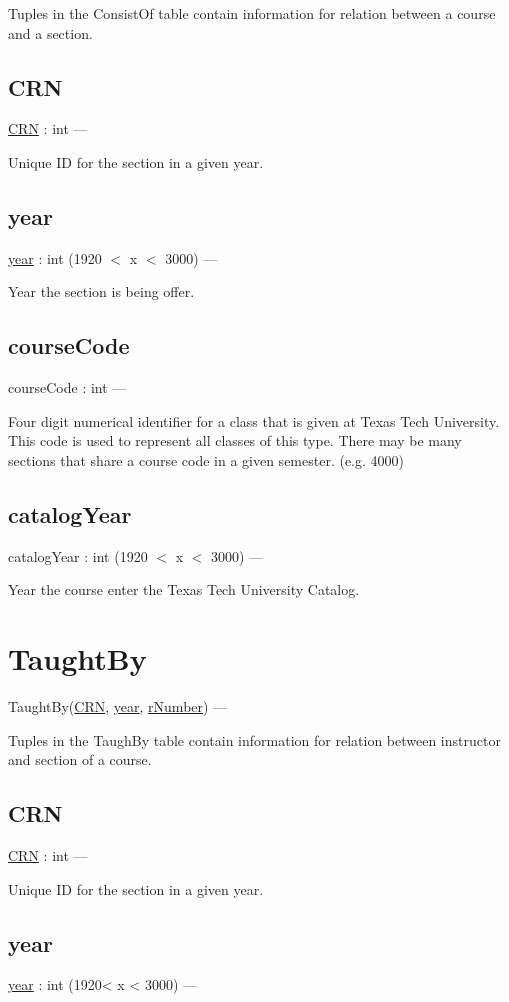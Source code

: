 \documentclass[10pt]{article}
\begin{document}
Tuples in the ConsistOf table contain information for relation between a course and a section.
	
	\subsection{CRN}
	\underline{CRN} : int ---
	
	Unique ID for the section in a given year.
	
	\subsection{year}
	\underline{year} : int (1920 $<$ x $<$ 3000) ---
	
	Year the section is being offer.
	
	\subsection{courseCode}
	courseCode : int ---
	
	Four digit numerical identifier for a class that is given at Texas Tech University. This code is used to represent all classes of this type. There may be many sections that share a course code in a given semester. (e.g. 4000)
	
	\subsection{catalogYear}
	catalogYear : int (1920 $<$ x $<$ 3000) ---
	
	Year the course enter the Texas Tech University Catalog.


\section{TaughtBy}
TaughtBy(\underline{CRN}, \underline{year}, \underline{rNumber}) ---

Tuples in the TaughBy table contain information for relation between instructor and section of a course.
 	
 	\subsection{CRN}
	\underline{CRN} : int ---
	
	Unique ID for the section in a given year.
	
	\subsection{year}
	\underline{year} : int (1920< x < 3000) ---
	
\end{document}

